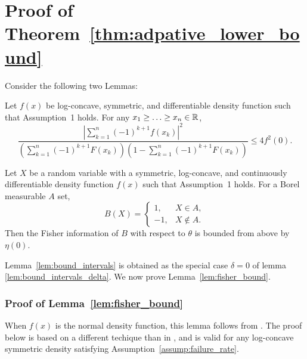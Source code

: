 \section{Proof of Theorem~\ref{thm:adpative_lower_bound}
\label{proof:thm:adpative_lower_bound}
}
Consider the following two Lemmas:
\begin{lem} \label{lem:bound_intervals}
Let $f(x)$ be log-concave, symmetric, and differentiable density function such that Assumption~1 holds. For any $x_1 \geq \ldots \geq x_n \in \mathbb{R}$,
\begin{equation}
\frac{ \left| \sum_{k=1}^n (-1)^{k+1} f(x_k) \right|^2 }
{\left( \sum_{k=1}^n (-1)^{k+1} F(x_k) \right) \left(1- \sum_{k=1}^n (-1)^{k+1} F(x_k) \right) } 
\leq  4f^2(0). 
\label{eq:lem_bound_intervals}
\end{equation}
\end{lem}
\begin{lem} \label{lem:fisher_bound}
Let $X$ be a random variable with a symmetric, log-concave, and continuously differentiable density function $f(x)$ such that Assumption~1 holds. For a Borel measurable $A$ set, 
\[
B(X) = \begin{cases} 1,& X \in A, \\
-1, & X \notin A.
\end{cases}
\]
Then the Fisher information of $B$ with respect to $\theta$ is bounded from above by $\eta(0)$.
\end{lem}

Lemma~\ref{lem:bound_intervals} is obtained as the special case $\delta = 0$ of lemma \ref{lem:bound_intervals_delta}. 
We now prove Lemma~\ref{lem:fisher_bound}.
\subsubsection*{Proof of Lemma~\ref{lem:fisher_bound}}
When $f(x)$ is the normal density function, this lemma follows from \cite[Thm. 3]{Barnes2018}. The proof below is based on a different techique than in \cite{Barnes2018}, and is valid for any log-concave symmetric density satisfying Assumption~\ref{assump:failure_rate}. \\

